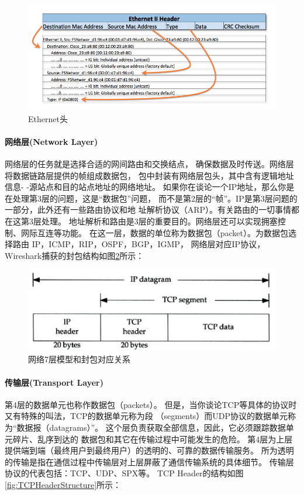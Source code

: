 \documentclass{book}
\begin{document}
\begin{figure}[htbp]
	\centering
	\includegraphics[scale=0.4]{ethernet-header.jpg}
	\caption{Ethernet头}
	\label{fig:ethernetheader}
\end{figure}

\paragraph{网络层(Network Layer)}网络层的任务就是选择合适的网间路由和交换结点，
确保数据及时传送。网络层将数据链路层提供的帧组成数据包，
包中封装有网络层包头，其中含有逻辑地址信息- -源站点和目的站点地址的网络地址。
如果你在谈论一个IP地址，那么你是在处理第3层的问题，这是“数据包”问题，
而不是第2层的“帧”。IP是第3层问题的一部分，此外还有一些路由协议和地 址解析协议（ARP）。有关路由的一切事情都在这第3层处理。
地址解析和路由是3层的重要目的。网络层还可以实现拥塞控制、网际互连等功能。
在这一层，数据的单位称为数据包（packet）。为数据包选择路由 IP，ICMP，RIP，OSPF，BGP，IGMP，
网络层对应IP协议，
Wireshark捕获的封包结构如图\ref{fig:IPDiagram}所示：

\begin{figure}[htbp]
	\centering
	\includegraphics[scale=0.6]{IPDiagram.jpg}
	\caption{网络7层模型和封包对应关系}
	\label{fig:IPDiagram}
\end{figure}

\paragraph{传输层(Transport Layer)}第4层的数据单元也称作数据包（packets）。
但是，当你谈论TCP等具体的协议时又有特殊的叫法，TCP的数据单元称为段 （segments）而UDP协议的数据单元称为“数据报（datagrams）”。
这个层负责获取全部信息，因此，它必须跟踪数据单元碎片、乱序到达的 数据包和其它在传输过程中可能发生的危险。
第4层为上层提供端到端（最终用户到最终用户）的透明的、可靠的数据传输服务。
所为透明的传输是指在通信过程中传输层对上层屏蔽了通信传输系统的具体细节。
传输层协议的代表包括：TCP、UDP、SPX等。
TCP Header的结构如图\ref{fig:TCPHeaderStructure}所示：
\end{document}
